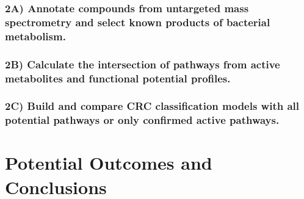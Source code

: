\documentclass[11pt]{article}
\begin{document}
\subsubsection*{2A) Annotate compounds from untargeted mass spectrometry and select known products of bacterial metabolism.}

\subsubsection*{2B) Calculate the intersection of pathways from active metabolites and functional potential profiles.}

\subsubsection*{2C) Build and compare CRC classification models with all potential pathways or only confirmed active pathways.}


\section*{Potential Outcomes and Conclusions}


\pagebreak

\section*{\refname}
\footnotesize{

\par}
\end{document}
